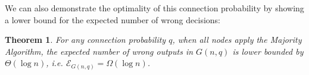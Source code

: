 \documentclass[a4paper,UKenglish]{lipics}
\newtheorem{thm}{Theorem}[section] %
\theoremstyle{definition}
\begin{document}
We can also demonstrate the optimality of this connection probability by showing a lower bound for the expected number of wrong decisions:

\begin{thm}
\label{thm:random graph log n bound}
For any connection probability $q$, when all nodes apply the Majority Algorithm, the expected number of wrong outputs in $G(n,q)$ is lower bounded by $\Theta(\log n)$, i.e. $\mathcal{E}_{G(n,q)} = \Omega(\log n)$.
\end{thm}


%
\end{document}
